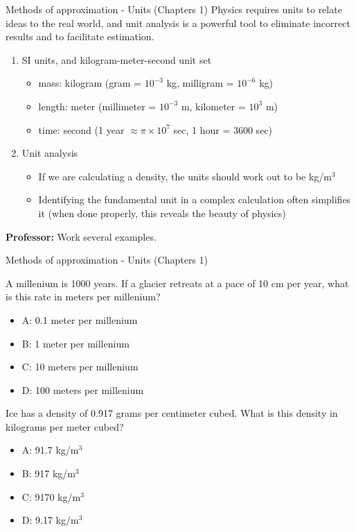 \documentclass{beamer}
\begin{document}
\begin{frame}{Methods of approximation - Units (Chapters 1)}
Physics requires \alert{units} to relate ideas to the real world, and \alert{unit analysis} is a powerful tool to eliminate incorrect results and to facilitate estimation.
\begin{enumerate}
\item SI units, and kilogram-meter-second unit set
\begin{itemize}
\item mass: \alert{kilogram} (gram = $10^{-3}$ kg, milligram = $10^{-6}$ kg)
\item length: \alert{meter} (millimeter = $10^{-3}$ m, kilometer = $10^{3}$ m)
\item time: \alert{second} (1 year $\approx \pi \times 10^{7}$ sec, 1 hour = 3600 sec)
\end{itemize}
\item Unit analysis
\begin{itemize}
\item If we are calculating a density, the units should work out to be kg/m$^3$
\item Identifying the fundamental unit in a complex calculation often simplifies it (when done properly, this reveals the beauty of physics)
\end{itemize}
\end{enumerate}
\textbf{Professor:} Work several examples.
\end{frame}

\begin{frame}{Methods of approximation - Units (Chapters 1)}
\small
\begin{minipage}[b]{0.45\linewidth}
A millenium is 1000 years.  If a glacier retreats at a pace of 10 cm per year, what is this rate in meters per millenium?
\vspace{0.2cm}
\begin{itemize}
\item A: 0.1 meter per millenium
\item B: 1 meter per millenium
\item C: 10 meters per millenium
\item D: 100 meters per millenium
\end{itemize}
\end{minipage}
\hspace{0.5cm}
\begin{minipage}[b]{0.45\linewidth}
Ice has a density of 0.917 grams per centimeter cubed.  What is this density in kilograms per meter cubed?
\vspace{1.1cm}
\begin{itemize}
\item A: 91.7 kg/m$^3$
\item B: 917 kg/m$^3$
\item C: 9170 kg/m$^3$
\item D: 9.17 kg/m$^3$
\end{itemize}
\end{minipage}
\end{frame}
\end{document}
